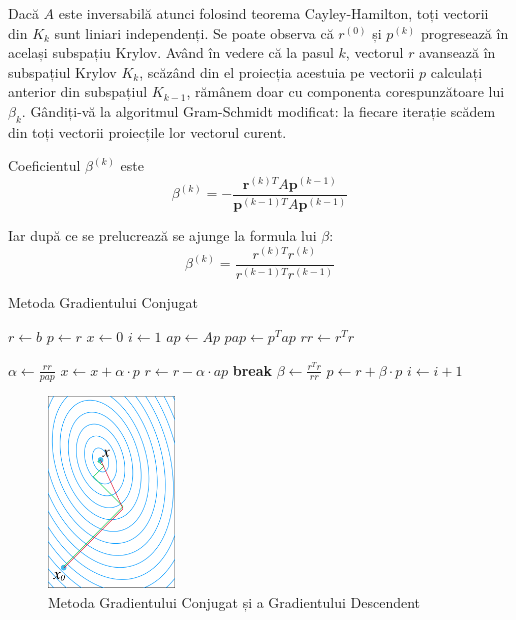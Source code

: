 \documentclass{exam}
\begin{document}
Dacă $A$ este inversabilă atunci folosind teorema Cayley-Hamilton, toți vectorii
din $K_k$ sunt liniari independenți. Se poate observa că $r^{(0)}$ și $p^{(k)}$
progresează în același subspațiu Krylov. Având în vedere că la pasul $k$,
vectorul $r$ avansează în subspațiul Krylov $K_k$, scăzând din el proiecția
acestuia pe vectorii $p$ calculați anterior din subspațiul $K_{k-1}$, rămânem
doar cu componenta corespunzătoare lui $\beta_k$. Gândiți-vă la algoritmul
Gram-Schmidt modificat: la fiecare iterație scădem din toți vectorii proiecțile
lor vectorul curent.

Coeficientul $\beta^{(k)}$ este
\begin{equation*}
	\beta^{(k)} = -\frac{\mathbf{r}^{(k)T} A \mathbf{p}^{(k-1)}}{\mathbf{p}^{(k-1)T} A \mathbf{p}^{(k-1)}}
\end{equation*}

Iar după ce se prelucrează se ajunge la formula lui $\beta$:
\begin{equation*}
	\beta^{(k)} = \frac{r^{(k)T} r^{(k)}}{r^{(k-1)T} r^{(k-1)}}
\end{equation*}

\begin{algorithm}
	\caption{Metoda Gradientului Conjugat}
	\begin{algorithmic}[1]
		\State $r \gets b$
		\State $p\gets r$
		\State $x \gets 0$
		\State $i \gets 1$
		\State $ap \gets A p$
		\State $pap \gets p^T ap$
		\State $rr \gets r^T r$

		\State $\alpha \gets \frac{rr}{pap}$
		\State $x \gets x + \alpha\cdot p$
		\State $r \gets r - \alpha \cdot ap$
		\State \textbf{break}
		\EndIf
		\State $\beta \gets \frac{r^T r}{rr}$
		\State $p \gets r + \beta \cdot p$
		\State $i \gets i + 1$
		\EndWhile
	\end{algorithmic}
\end{algorithm}

\begin{figure}[ht]
	\centering
	\includegraphics[width=0.3\textwidth]{conjugate_vs_steepest.png}
	\caption{Metoda Gradientului Conjugat și a Gradientului Descendent}
	\label{fig:2}
\end{figure}
\end{document}
